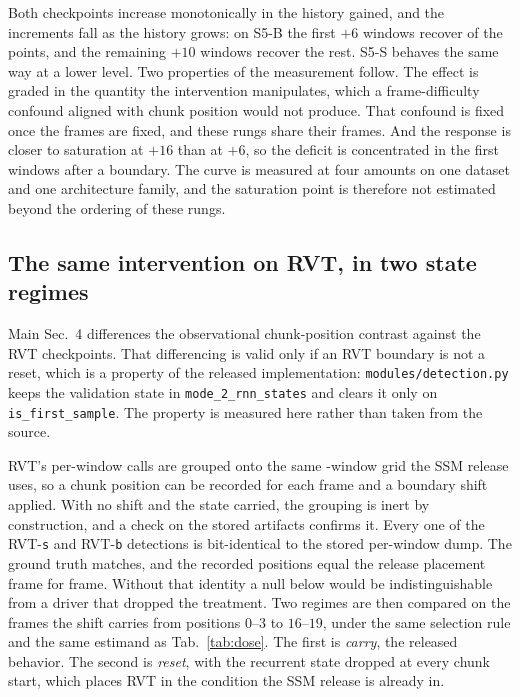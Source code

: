 \documentclass[10pt,twocolumn,letterpaper]{article}
\begin{document}
Both checkpoints increase monotonically in the history gained, and the increments fall as
the history grows: on S5-B the first $+6$ windows recover \ssmDoseBaseSix{} of the
\ssmPairedMapVelBase{} points, and the remaining $+10$ windows recover the rest. S5-S
behaves the same way at a lower level. Two properties of the measurement follow. The effect
is graded in the quantity the intervention manipulates, which a frame-difficulty confound
aligned with chunk position would not produce. That confound is fixed once the frames
are fixed, and these rungs share their frames. And the response is closer to saturation at
$+16$ than at $+6$, so the deficit is concentrated in the first windows after a boundary.
The curve is measured at four amounts on one dataset and one architecture family, and the
saturation point is therefore not estimated beyond the ordering of these rungs.

\subsection{The same intervention on RVT, in two state regimes}
\label{sup:rvtbound}

Main Sec.~4 differences the observational chunk-position contrast against the
RVT checkpoints. That differencing is valid only if an RVT boundary is not a reset, which is
a property of the released implementation: \texttt{modules/detection.py} keeps the validation
state in \texttt{mode\_2\_rnn\_states} and clears it only on \texttt{is\_first\_sample}. The
property is measured here rather than taken from the source.

RVT's per-window calls are grouped onto the same \ssmEvalChunk{}-window grid the SSM release
uses, so a chunk position can be recorded for each frame and a boundary shift applied. With
no shift and the state carried, the grouping is inert by construction, and
a check on the stored artifacts confirms it. Every one of the
\rvtBoundDetsS{} RVT-\texttt{s} and \rvtBoundDetsB{} RVT-\texttt{b} detections is bit-identical to the
stored per-window dump. The ground truth matches, and the recorded positions equal the
release placement frame for frame. Without that identity a null below would be indistinguishable
from a driver that dropped the treatment. Two regimes are then compared on the \rvtBoundN{}
frames the shift carries from positions $0$--$3$ to $16$--$19$, under the same selection rule
and the same estimand as Tab.~\ref{tab:dose}. The first is \emph{carry}, the released
behavior. The second is \emph{reset},
with the recurrent state dropped at every chunk start, which places RVT in the condition the
SSM release is already in.
\end{document}
